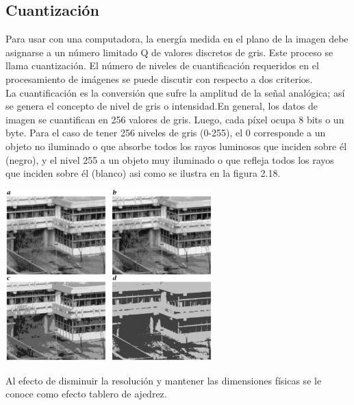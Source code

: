 \subsection{Cuantización}
Para usar con una computadora, la energía medida en el plano de la imagen debe
asignarse a un número limitado Q de valores discretos de gris. Este proceso se llama
cuantización. El número de niveles de cuantificación requeridos en el procesamiento de
imágenes se puede discutir con respecto a dos criterios.\cite{Book:Richard2011}\\
La cuantificación es la conversión
que sufre la amplitud de la señal analógica; así se genera el concepto de nivel de gris o
intensidad.En general, los datos de imagen se cuantifican en 256 valores de gris.
Luego, cada píxel ocupa 8 bits o un byte. Para el caso de tener 256 niveles de gris (0-255), el 0 corresponde a un
objeto no iluminado o que absorbe todos los rayos luminosos que inciden sobre él
(negro), y el nivel 255 a un objeto muy iluminado o que refleja todos los rayos que
inciden sobre él (blanco) asi como se ilustra en la figura 2.18.
\begin{center}
	\includegraphics[width=0.6\textwidth]{Contenido/Cuerpo/Capitulo2/Fig9.eps}
	\label{fig:MarcoTeorico:Fig18}
\end{center}
Al efecto de disminuir la resolución y mantener las
dimensiones físicas se le conoce como efecto tablero de ajedrez.

